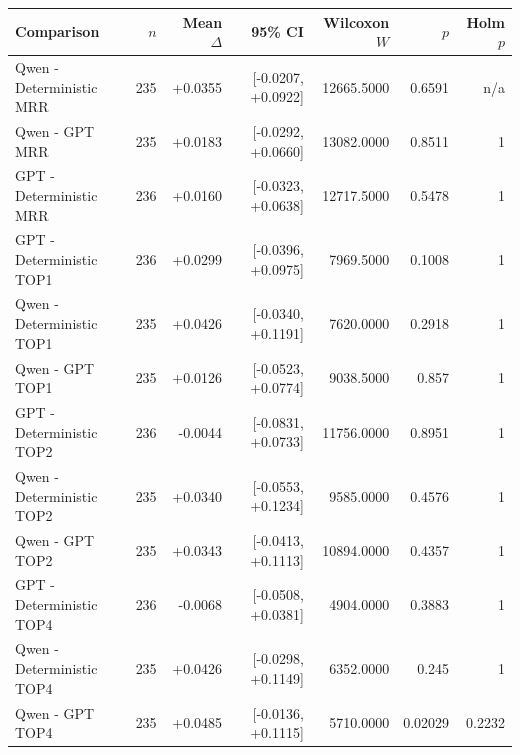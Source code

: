 \begin{tabular}{lrrrrrr}
\hline
Comparison & $n$ & Mean $\Delta$ & 95\% CI & Wilcoxon $W$ & $p$ & Holm $p$ \\
\hline
Qwen - Deterministic MRR & 235 & +0.0355 & [-0.0207, +0.0922] & 12665.5000 & 0.6591 & n/a \\
Qwen - GPT MRR & 235 & +0.0183 & [-0.0292, +0.0660] & 13082.0000 & 0.8511 & 1 \\
GPT - Deterministic MRR & 236 & +0.0160 & [-0.0323, +0.0638] & 12717.5000 & 0.5478 & 1 \\
GPT - Deterministic TOP1 & 236 & +0.0299 & [-0.0396, +0.0975] & 7969.5000 & 0.1008 & 1 \\
Qwen - Deterministic TOP1 & 235 & +0.0426 & [-0.0340, +0.1191] & 7620.0000 & 0.2918 & 1 \\
Qwen - GPT TOP1 & 235 & +0.0126 & [-0.0523, +0.0774] & 9038.5000 & 0.857 & 1 \\
GPT - Deterministic TOP2 & 236 & -0.0044 & [-0.0831, +0.0733] & 11756.0000 & 0.8951 & 1 \\
Qwen - Deterministic TOP2 & 235 & +0.0340 & [-0.0553, +0.1234] & 9585.0000 & 0.4576 & 1 \\
Qwen - GPT TOP2 & 235 & +0.0343 & [-0.0413, +0.1113] & 10894.0000 & 0.4357 & 1 \\
GPT - Deterministic TOP4 & 236 & -0.0068 & [-0.0508, +0.0381] & 4904.0000 & 0.3883 & 1 \\
Qwen - Deterministic TOP4 & 235 & +0.0426 & [-0.0298, +0.1149] & 6352.0000 & 0.245 & 1 \\
Qwen - GPT TOP4 & 235 & +0.0485 & [-0.0136, +0.1115] & 5710.0000 & 0.02029 & 0.2232 \\
\hline
\end{tabular}
